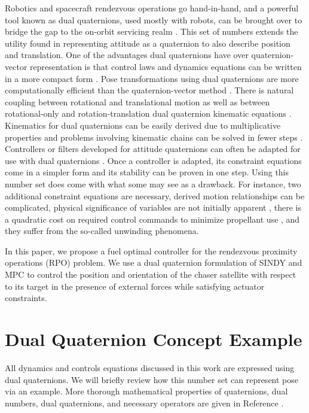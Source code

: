 \documentclass[letterpaper, preprint, paper,11pt]{AAS}	%
\begin{document}
Robotics and spacecraft rendezvous operations go hand-in-hand, and a powerful tool known as dual quaternions, used mostly with robots, can be brought over to bridge the gap to the on-orbit servicing realm \cite{TsiotrasValverde_DualQTool}. This set of numbers extends the utility found in representing attitude as a quaternion to also describe position and translation. One of the advantages dual quaternions have over quaternion-vector representation is that control laws and dynamics equations can be written in a more compact form \cite{FilipeTsiotras_AdaptiveDualQ,FilipeKontitsis_ExtendedKalmanFilterDualQ}. Pose transformations using dual quaternions are more computationally efficient than the quaternion-vector method \cite{FilipeTsiotras_AdaptiveDualQ,ReynoldsSzmuk_DualQDescent}. There is natural coupling between rotational and translational motion as well as between rotational-only and rotation-translation dual quaternion kinematic equations \cite{FilipeTsiotras_AdaptiveDualQ}. Kinematics for dual quaternions can be easily derived due to multiplicative properties and problems involving kinematic chains can be solved in fewer steps \cite{DooleyMcCarthy_SpatialRBDDualQ}. Controllers or filters developed for attitude quaternions can often be adapted for use with dual quaternions \cite{FilipeTsiotras_AdaptiveDualQ, ValverdeTsiotras_SCRobotDualQ}. Once a controller is adapted, its constraint equations come in a simpler form \cite{DooleyMcCarthy_SpatialRBDDualQ} and its stability can be proven in one step\cite{FilipeTsiotras_AdaptiveDualQ}. Using this number set does come with what some may see as a drawback. For instance, two additional constraint equations are necessary, derived motion relationships can be complicated, physical significance of variables are not initially apparent \cite{DooleyMcCarthy_SpatialRBDDualQ}, there is a quadratic cost on required control commands to minimize propellant use \cite{LeeMesbahi_ConstrainedMPCDualQ}, and they suffer from the so-called unwinding phenomena\cite{FilipeTsiotras_AdaptiveDualQ}.

In this paper, we propose a fuel optimal controller for the rendezvous proximity operations (RPO) problem. We use a dual quaternion formulation of SINDY and MPC to control the position and orientation of the chaser satellite with respect to its target in the presence of external forces while satisfying actuator constraints. 

\section{Dual Quaternion Concept Example}
All dynamics and controls equations discussed in this work are expressed using dual quaternions. We will briefly review how this number set can represent pose via an example. More thorough mathematical properties of quaternions, dual numbers, dual quaternions, and necessary operators are given in Reference . 
\end{document}
